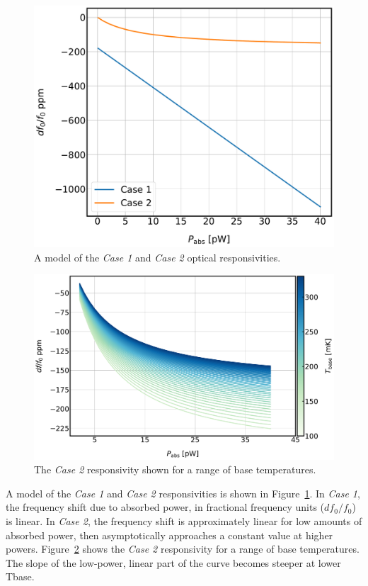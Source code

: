 \begin{figure}[!htbp]
\centering
\includegraphics[width=\textwidth]{figures/kid_model/resp_case1_case2}
\caption[A model of the case~1 and case~2 optical responsivities.]{A model of the \textit{Case 1} and \textit{Case 2} optical responsivities.}
\label{fig:responsivity}
\end{figure}

\begin{figure}[!htbp]
\centering
\includegraphics[width=\textwidth]{figures/kid_model/resp_case2_T}
\caption[The case~2 responsivity shown for a range of base temperatures.]{The \textit{Case 2} responsivity shown for a range of base temperatures.}
\label{fig:case 2 responsivity}
\end{figure}

A model of the \textit{Case 1} and \textit{Case 2} responsivities is shown in Figure~\ref{fig:responsivity}. In \textit{Case 1}, the frequency shift due to absorbed power, in fractional frequency units ($df_{0}/f_{0}$) is linear. In \textit{Case 2}, the frequency shift is approximately linear for low amounts of absorbed power, then asymptotically approaches a constant value at higher powers. Figure~\ref{fig:case 2 responsivity} shows the \textit{Case 2} responsivity for a range of base temperatures. The slope of the low-power, linear part of the curve becomes steeper at lower \gls{Tbase}.

